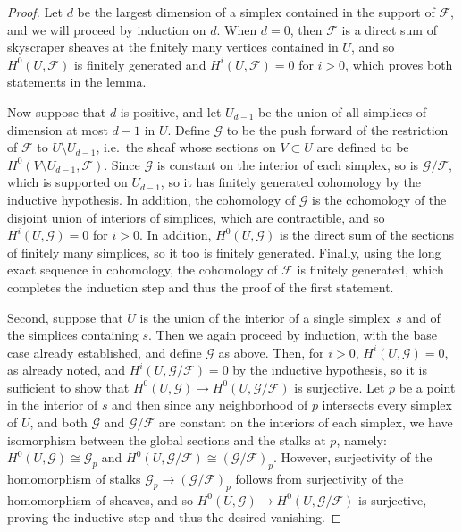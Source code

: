 \documentclass[11pt,reqno]{amsart}
\theoremstyle{definition}
\newcommand{\cF}{\mathcal F}
\newcommand{\cG}{\mathcal G}
\newcommand{\isom}{\cong}
\begin{document}
\begin{proof}
Let $d$ be the largest dimension of a simplex contained in the support of $\cF$,
and we will proceed by induction on $d$. When $d=0$, then $\cF$ is a direct sum
of skyscraper sheaves at the finitely many vertices contained in $U$, and so
$H^0(U, \cF)$ is finitely generated and $H^i(U, \cF) = 0$ for $i > 0$, which
proves both statements in the lemma.

Now suppose that $d$ is
positive, and let $U_{d-1}$ be the union of all simplices of dimension at most
$d-1$ in $U$. Define $\cG$ to be the push forward of the restriction of
$\cF$ to $U \setminus U_{d-1}$, i.e.\ the sheaf whose sections on $V \subset U$
are defined to be $H^0(V \setminus U_{d-1}, \cF)$. Since $\cG$ is constant on
the interior of each simplex, so is $\cG/\cF$, which is supported on $U_{d-1}$,
so it has finitely generated cohomology by the inductive hypothesis. In
addition, the cohomology of $\cG$ is the cohomology of the disjoint union of
interiors of simplices, which are contractible, and so $H^i(U, \cG) = 0$ for $i
> 0$. In addition, $H^0(U, \cG)$ is the direct sum of
the sections of finitely many simplices, so it too is finitely generated.
Finally, using the long exact sequence in cohomology, the cohomology of $\cF$ is
finitely generated, which completes the induction step and thus the proof of the
first statement.

Second, suppose that $U$ is the union of the interior of a single simplex~$s$
and of the simplices containing $s$. Then we again proceed by induction, with
the base case already established, and define $\cG$ as above. Then, for $i > 0$,
$H^i(U, \cG) = 0$, as already noted, and $H^i(U, \cG/\cF) = 0$ by the inductive
hypothesis, so it is sufficient to show that $H^0(U, \cG) \rightarrow H^0(U,
\cG/\cF)$ is surjective. Let $p$ be a point in the interior of $s$ and then
since any neighborhood of $p$ intersects every simplex of $U$, and both $\cG$
and $\cG/\cF$ are constant on the interiors of each simplex, we have isomorphism
between the global sections and the stalks at $p$, namely: $H^0(U, \cG) \isom
\cG_p$ and $H^0(U, \cG/\cF) \isom (\cG/\cF)_p$. However, surjectivity of the
homomorphism of stalks $\cG_p \rightarrow (\cG/\cF)_p$ follows from surjectivity
of the homomorphism of sheaves, and so $H^0(U, \cG) \rightarrow H^0(U, \cG/\cF)$
is surjective, proving the inductive step and thus the desired vanishing.
\end{proof}
\end{document}
